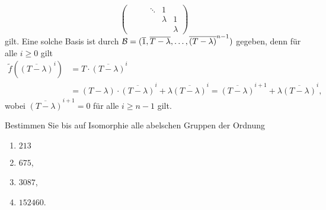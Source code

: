 \begin{solution}
\begin{enumerate}
\[\begin{pmatrix}
                  &         &         & \ddots  & 1       &         \\
                  &         &         &         & \lambda & 1       \\
                  &         &         &         &         & \lambda 
        \end{pmatrix}
      \]
      gilt.
      Eine solche Basis ist durch $\mathcal{B} = (\overline{1}, \overline{T - \lambda}, \dotsc, \overline{(T - \lambda)}^{n-1})$ gegeben, denn für alle $i \geq 0$ gilt
      \begin{align*}
            \tilde{f}\left( \overline{(T-\lambda)}^i \right)
        &=  T \cdot \overline{(T-\lambda)}^i
        \\
        &=  (T-\lambda) \cdot \overline{(T-\lambda)}^i + \lambda \overline{(T-\lambda)}^i
         =  \overline{(T-\lambda)}^{i+1} + \lambda \overline{(T-\lambda)}^i,
      \end{align*}
      wobei $\overline{(T-\lambda)}^{i+1} = 0$ für alle $i \geq n-1$ gilt.
  \end{enumerate}
\end{solution}


\begin{question}[subtitle = Abelsche Gruppen endlicher Ordnung]
  Bestimmen Sie bis auf Isomorphie alle abelschen Gruppen der Ordnung
  \begin{enumerate}
    \item
      $213$
    \item
      $675$,
    \item
      $3087$,
    \item
      $152460$.
  \end{enumerate}
\end{question}



